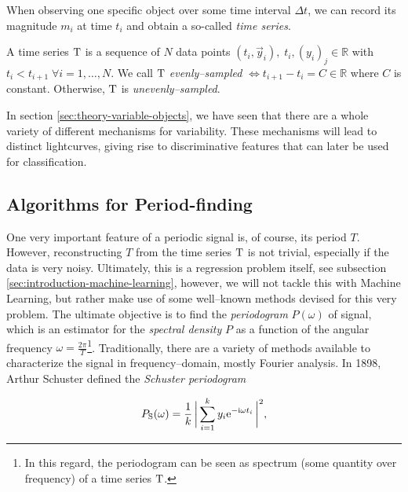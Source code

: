 When observing one specific object over some time interval $\Delta t$, we can record its magnitude $m_i$ at time $t_i$ and obtain a so-called \emph{time series}.

\begin{definition}
A time series $\mathrm{T}$ is a sequence of $N$ data points $(t_i, \vec y_i),\; t_i,(y_i)_j \in \mathbb{R}$ with $t_i < t_{i+1} \; \forall i = 1,\ldots,N$. We call $\mathrm{T}$ \emph{evenly--sampled} $\Leftrightarrow t_{i+1} - t_i = C \in \mathbb{R}$ where $C$ is constant. Otherwise, $\mathrm{T}$ is \emph{unevenly--sampled}.
\end{definition}

In section \ref{sec:theory-variable-objects}, we have seen that there are a whole variety of different mechanisms for variability. These mechanisms will lead to distinct lightcurves, giving rise to discriminative features that can later be used for classification.

\subsection{Algorithms for Period-finding}

One very important feature of a periodic signal is, of course, its period $T$. However, reconstructing $T$ from the time series $\mathrm{T}$ is not trivial, especially if the data is very noisy. Ultimately, this is a regression problem itself, see subsection \ref{sec:introduction-machine-learning}, however, we will not tackle this with Machine Learning, but rather make use of some well--known methods devised for this very problem. The ultimate objective is to find the \emph{periodogram} $P(\omega)$ of signal, which is an estimator for the \emph{spectral density} $P$ as a function of the angular frequency $\omega = \frac{2 \pi}{T}$\footnote{In this regard, the periodogram can be seen as spectrum (some quantity over frequency) of a time series $\mathrm{T}$.}. Traditionally, there are a variety of methods available to characterize the signal in frequency--domain, mostly Fourier analysis. In 1898, Arthur Schuster defined the \emph{Schuster periodogram}

\begin{equation}
\label{eg:schuster-periodogram}
P_{\text{S}}(\omega) = \frac{1}{k} \, \biggl| \, \sum\limits_{i=1}^{k} y_i \mathrm{e}^{-\mathrm{i} \omega t_i} \, \biggr|^2,
\end{equation}


